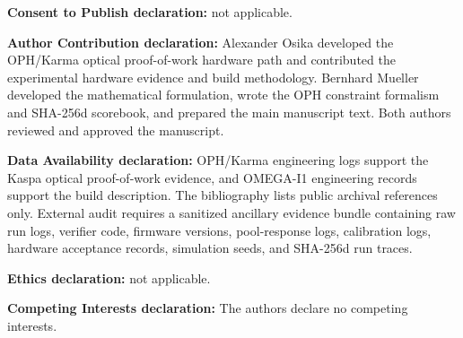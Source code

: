 \documentclass[11pt]{article}
\theoremstyle{definition}
\theoremstyle{remark}
\begin{document}
\noindent\textbf{Consent to Publish declaration:} not applicable.

\noindent\textbf{Author Contribution declaration:} Alexander Osika developed
the OPH/Karma optical proof-of-work hardware path and contributed the
experimental hardware evidence and build methodology. Bernhard Mueller
developed the mathematical formulation, wrote the OPH constraint formalism and
SHA-256d scorebook, and prepared the main manuscript text. Both authors
reviewed and approved the manuscript.

\noindent\textbf{Data Availability declaration:} OPH/Karma engineering logs
support the Kaspa optical proof-of-work evidence, and OMEGA-I1 engineering
records support the build description. The bibliography lists public archival
references only. External audit requires a sanitized ancillary evidence bundle
containing raw run logs, verifier code, firmware versions, pool-response logs,
calibration logs, hardware acceptance records, simulation seeds, and SHA-256d
run traces.

\noindent\textbf{Ethics declaration:} not applicable.

\noindent\textbf{Competing Interests declaration:} The authors declare no
competing interests.
\end{document}
